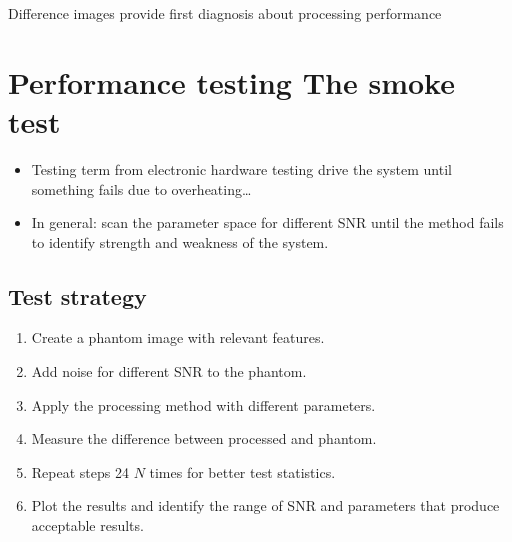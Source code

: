 \documentclass[letterpaper,10pt,english]{sphinxmanual}
\begin{document}
\sphinxAtStartPar
Difference images provide first diagnosis about processing performance


\section{Performance testing \sphinxhyphen{} The smoke test}
\label{\detokenize{02-ImageEnhancement:performance-testing-the-smoke-test}}\begin{itemize}
\item {} 
\sphinxAtStartPar
Testing term from electronic hardware testing \sphinxhyphen{} drive the system until something fails due to overheating…

\item {} 
\sphinxAtStartPar
In general: scan the parameter space for different SNR until the method fails to identify strength and weakness of the system.

\end{itemize}


\subsection{Test strategy}
\label{\detokenize{02-ImageEnhancement:test-strategy}}\begin{enumerate}
%
\item {} 
\sphinxAtStartPar
Create a phantom image with relevant features.

\item {} 
\sphinxAtStartPar
Add noise for different SNR to the phantom.

\item {} 
\sphinxAtStartPar
Apply the processing method with different parameters.

\item {} 
\sphinxAtStartPar
Measure the difference between processed and phantom.

\item {} 
\sphinxAtStartPar
Repeat steps 2\sphinxhyphen{}4 \(N\) times for better test statistics.

\item {} 
\sphinxAtStartPar
Plot the results and identify the range of SNR and parameters that produce acceptable results.

\end{enumerate}
\end{document}
